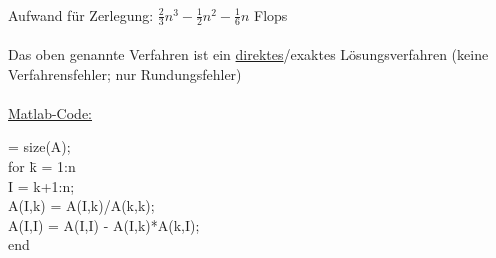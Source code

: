 \documentclass[a4paper,twocolumn,10pt]{article}
\begin{document}
\\Aufwand für Zerlegung: $\frac{2}{3}n^3-\frac{1}{2}n^2-\frac{1}{6}n$ Flops\\\\
Das oben genannte Verfahren ist ein \underline{direktes}/exaktes Lösungsverfahren (keine Verfahrensfehler; nur Rundungsfehler)\\\\
\underline{Matlab-Code:}
\begin{tabbing}
[n,$\sim$] = size(A);\\
for \=k = 1:n\\
    \>I = k+1:n;\\
    \>A(I,k) = A(I,k)/A(k,k);\\
    \>A(I,I) = A(I,I) - A(I,k)*A(k,I);\\
end
\end{tabbing}
\end{document}
